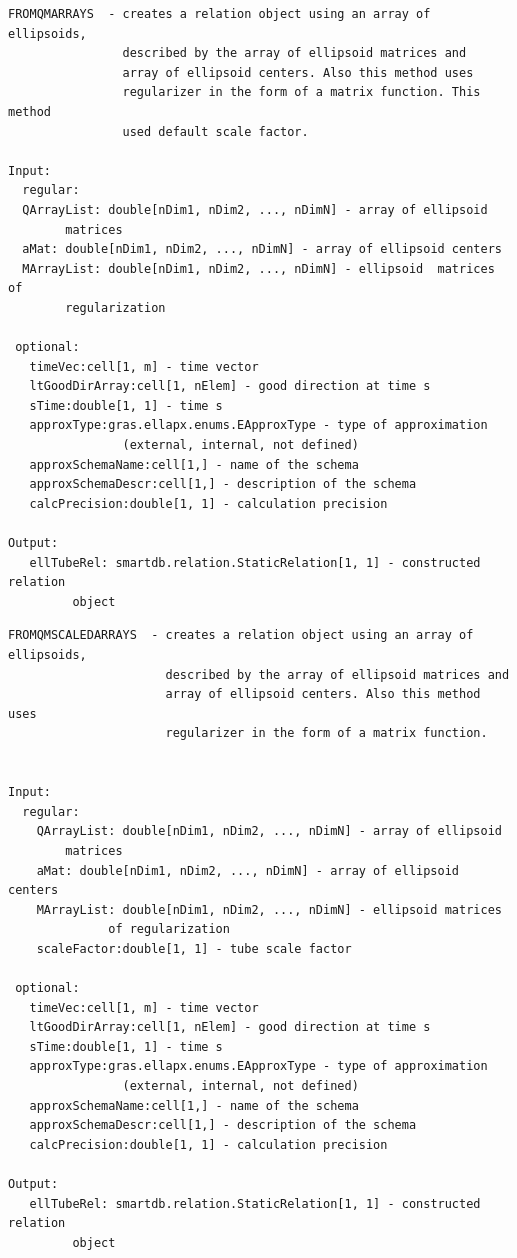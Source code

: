\documentclass[letterpaper,10pt,english]{sphinxmanual}
\begin{document}
\begin{Verbatim}[commandchars=\\\{\}]
FROMQMARRAYS  - creates a relation object using an array of ellipsoids,
                described by the array of ellipsoid matrices and
                array of ellipsoid centers. Also this method uses
                regularizer in the form of a matrix function. This method
                used default scale factor.

Input:
  regular:
  QArrayList: double[nDim1, nDim2, ..., nDimN] - array of ellipsoid
        matrices
  aMat: double[nDim1, nDim2, ..., nDimN] - array of ellipsoid centers
  MArrayList: double[nDim1, nDim2, ..., nDimN] - ellipsoid  matrices of
        regularization

 optional:
   timeVec:cell[1, m] - time vector
   ltGoodDirArray:cell[1, nElem] - good direction at time s
   sTime:double[1, 1] - time s
   approxType:gras.ellapx.enums.EApproxType - type of approximation
                (external, internal, not defined)
   approxSchemaName:cell[1,] - name of the schema
   approxSchemaDescr:cell[1,] - description of the schema
   calcPrecision:double[1, 1] - calculation precision

Output:
   ellTubeRel: smartdb.relation.StaticRelation[1, 1] - constructed relation
         object
\end{Verbatim}

\begin{Verbatim}[commandchars=\\\{\}]
FROMQMSCALEDARRAYS  - creates a relation object using an array of ellipsoids,
                      described by the array of ellipsoid matrices and
                      array of ellipsoid centers. Also this method uses
                      regularizer in the form of a matrix function.


Input:
  regular:
    QArrayList: double[nDim1, nDim2, ..., nDimN] - array of ellipsoid
        matrices
    aMat: double[nDim1, nDim2, ..., nDimN] - array of ellipsoid centers
    MArrayList: double[nDim1, nDim2, ..., nDimN] - ellipsoid matrices
              of regularization
    scaleFactor:double[1, 1] - tube scale factor

 optional:
   timeVec:cell[1, m] - time vector
   ltGoodDirArray:cell[1, nElem] - good direction at time s
   sTime:double[1, 1] - time s
   approxType:gras.ellapx.enums.EApproxType - type of approximation
                (external, internal, not defined)
   approxSchemaName:cell[1,] - name of the schema
   approxSchemaDescr:cell[1,] - description of the schema
   calcPrecision:double[1, 1] - calculation precision

Output:
   ellTubeRel: smartdb.relation.StaticRelation[1, 1] - constructed relation
         object
\end{Verbatim}
\end{document}
